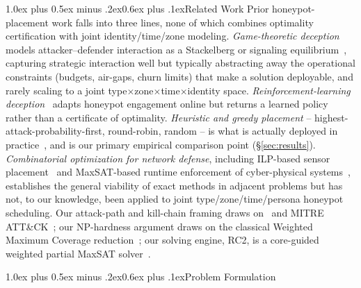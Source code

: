 \documentclass[10pt,twocolumn]{article}
\makeatletter
\renewcommand{\section}{\@startsection{section}{1}{0pt}%
  {1.0ex plus 0.5ex minus .2ex}{0.6ex plus .1ex}{\normalfont\large\bfseries}}
\makeatother
\begin{document}
\section{Related Work}
Prior honeypot-placement work falls into three lines, none of which combines optimality certification with joint identity/time/zone modeling. \emph{Game-theoretic deception} models attacker--defender interaction as a Stackelberg or signaling equilibrium~\cite{kiekintveld2015,pawlick2019,zhu2013}, capturing strategic interaction well but typically abstracting away the operational constraints (budgets, air-gaps, churn limits) that make a solution deployable, and rarely scaling to a joint type$\times$zone$\times$time$\times$identity space. \emph{Reinforcement-learning deception}~\cite{huang2019} adapts honeypot engagement online but returns a learned policy rather than a certificate of optimality. \emph{Heuristic and greedy placement} -- highest-attack-probability-first, round-robin, random -- is what is actually deployed in practice~\cite{provos2004,spitzner2003,wagener2009}, and is our primary empirical comparison point (\S\ref{sec:results}). \emph{Combinatorial optimization for network defense}, including ILP-based sensor placement~\cite{saha2015} and MaxSAT-based runtime enforcement of cyber-physical systems~\cite{pinisetty2017}, establishes the general viability of exact methods in adjacent problems but has not, to our knowledge, been applied to joint type/zone/time/persona honeypot scheduling. Our attack-path and kill-chain framing draws on~\cite{hutchins2011} and MITRE ATT\&CK~\cite{mitre2023}; our NP-hardness argument draws on the classical Weighted Maximum Coverage reduction~\cite{feige1998}; our solving engine, RC2, is a core-guided weighted partial MaxSAT solver~\cite{narodytska2014,liffiton2016}.

\section{Problem Formulation}\label{sec:formulation}
\end{document}
